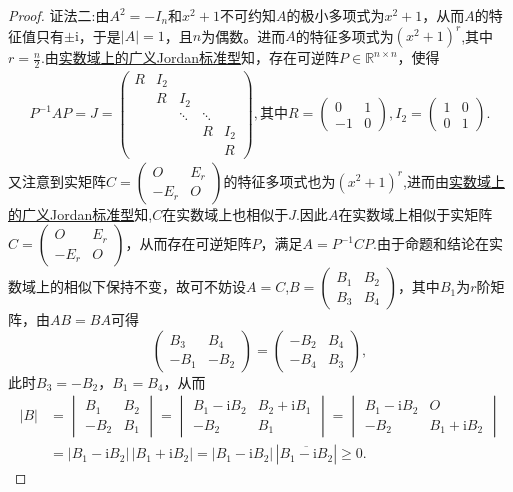 \documentclass[../../main.tex]{subfiles}
\begin{document}
\begin{proof}
{\color{blue} 证法二:}由\(A^2 = -I_n\)和\(x^2 + 1\)不可约知\(A\)的极小多项式为\(x^2 + 1\)，从而\(A\)的特征值只有\(\pm \mathrm{i}\)，于是\(|A| = 1\)，且\(n\)为偶数。进而\(A\)的特征多项式为\((x^2 + 1)^r\),其中$r=\frac{n}{2}$.由\hyperref[theorem:实数域上的广义Jordan标准型]{实数域上的广义Jordan标准型}知，存在可逆阵\(P \in \mathbb{R}^{n \times n}\)，使得
\begin{align*}
P^{-1}AP = J = \begin{pmatrix}
R & I_2 &  &  &  \\
 & R & I_2 &  &  \\
 &  & \ddots & \ddots &  \\
 &  &  & R & I_2 \\
 &  &  &  & R
\end{pmatrix},\text{其中}R = \begin{pmatrix} 0 & 1 \\ -1 & 0 \end{pmatrix},I_2 = \begin{pmatrix} 1 & 0 \\ 0 & 1 \end{pmatrix}.
\end{align*}
又注意到实矩阵$C = \begin{pmatrix} O & E_r \\ -E_r & O \end{pmatrix}$的特征多项式也为\((x^2 + 1)^r\),进而由\hyperref[theorem:实数域上的广义Jordan标准型]{实数域上的广义Jordan标准型}知,$C$在实数域上也相似于$J$.因此$A$在实数域上相似于实矩阵$C = \begin{pmatrix} O & E_r \\ -E_r & O \end{pmatrix}$，从而存在可逆矩阵$P$，满足$A = P^{-1}CP$.由于命题和结论在实数域上的相似下保持不变，故可不妨设$A=C$,$B = \begin{pmatrix} B_1 & B_2 \\ B_3 & B_4 \end{pmatrix}$，其中$B_1$为$r$阶矩阵，由$AB=BA$可得
$$
\begin{pmatrix} B_3 & B_4 \\ -B_1 & -B_2 \end{pmatrix} = \begin{pmatrix} -B_2 & B_4 \\ -B_4 & B_3 \end{pmatrix},
$$
此时$B_3 = -B_2$，$B_1 = B_4$，从而
\begin{align*}
|B| & = \begin{vmatrix} B_1 & B_2 \\ -B_2 & B_1 \end{vmatrix} = \begin{vmatrix} B_1 - \text{i}B_2 & B_2 + \text{i}B_1 \\ -B_2 & B_1 \end{vmatrix} = \begin{vmatrix} B_1 -  \text{i}B_2 & O \\ -B_2 & B_1 + \text{i}B_2 \end{vmatrix} \\
&= |B_1 - \text{i}B_2| \, |B_1 +  \text{i}B_2| = |B_1 - \text{i}B_2| \, |\overline{B_1 -  \text{i}B_2}| \geqslant 0.
\end{align*}


\end{proof}
\end{document}
